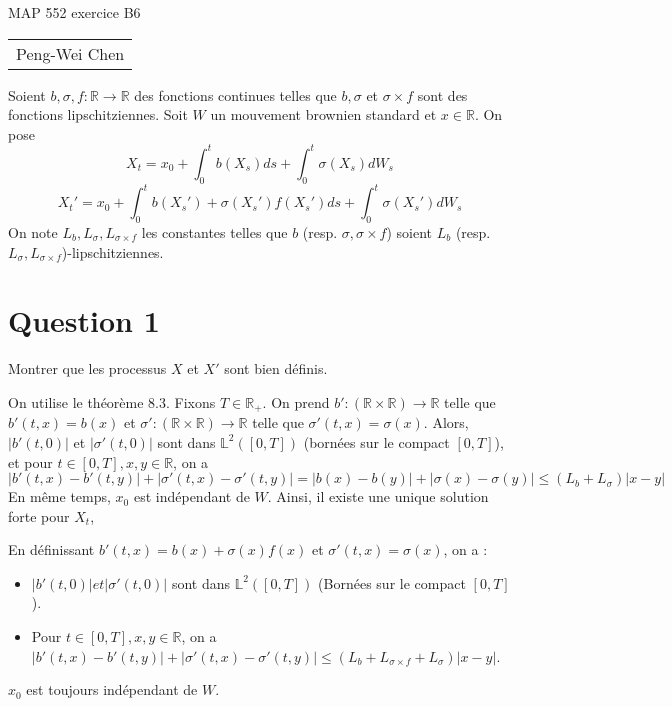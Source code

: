 \documentclass[12pt]{article}
\newcommand{\1}{\mathbb{I}} %
\begin{document}
\begin{center}
{\Large MAP 552 exercice B6}

\begin{tabular}{c}
Peng-Wei Chen\\
\end{tabular}
\end{center}

Soient $b, \sigma, f : \mathbb{R} \to \mathbb{R}$ des fonctions continues telles que $b, \sigma$ et $\sigma \times f$ sont des fonctions lipschitziennes. Soit $W$ un mouvement brownien standard et $x \in \mathbb{R}$. On pose
\[
    X_t = x_0 + \int_0^t b(X_s)ds + \int_0^t \sigma(X_s)dW_s
\]
\[
    X_t' = x_0 + \int_0^t b(X_s') + \sigma(X_s')f(X_s')ds + \int_0^t \sigma(X_s')dW_s
\]
On note $L_b, L_\sigma, L_{\sigma\times f}$ les constantes telles que $b$ (resp. $\sigma, \sigma \times f$) soient $L_b$ (resp. $L_\sigma, L_{\sigma\times f}$)-lipschitziennes.
\section*{Question 1}
Montrer que les processus $X$ et $X'$ sont bien définis.
\par
On utilise le théorème 8.3. Fixons $T \in \mathbb{R}_+$. On prend $b' : (\mathbb{R} \times \mathbb{R}) \to \mathbb{R}$ telle que $b'(t, x) = b(x)$ et $\sigma' : (\mathbb{R} \times \mathbb{R}) \to \mathbb{R}$ telle que $\sigma'(t, x) = \sigma(x)$. Alors, $|b'(t, 0)|$ et $|\sigma'(t, 0)|$ sont dans $\mathbb{L}^2([0, T])$ (bornées sur le compact $[0, T]$), et pour $t \in [0, T], x, y \in \mathbb{R}$, on a
\[
    |b'(t, x) - b'(t, y)| + |\sigma'(t, x) - \sigma'(t, y)| = |b(x)-b(y)|+|\sigma(x)-\sigma(y)| \le (L_b + L_\sigma)|x-y|
\]
En même temps, $x_0$ est indépendant de $W$. Ainsi, il existe une unique solution forte pour $X_t$, 

En définissant $b'(t, x) = b(x) + \sigma(x)f(x)$ et $\sigma'(t, x) = \sigma(x)$, on a :
\begin{itemize}
    \item $|b'(t, 0)| et |\sigma'(t, 0)|$ sont dans $\mathbb{L}^2([0, T])$ (Bornées sur le compact $[0, T]$).
    \item Pour $t \in [0, T], x, y \in \mathbb{R}$, on a $|b'(t, x) - b'(t, y)| + |\sigma'(t, x) - \sigma'(t, y)| \le (L_b + L_{\sigma \times f} + L_\sigma)|x-y|$.
\end{itemize}
$x_0$ est toujours indépendant de $W$. \\
\end{document}
